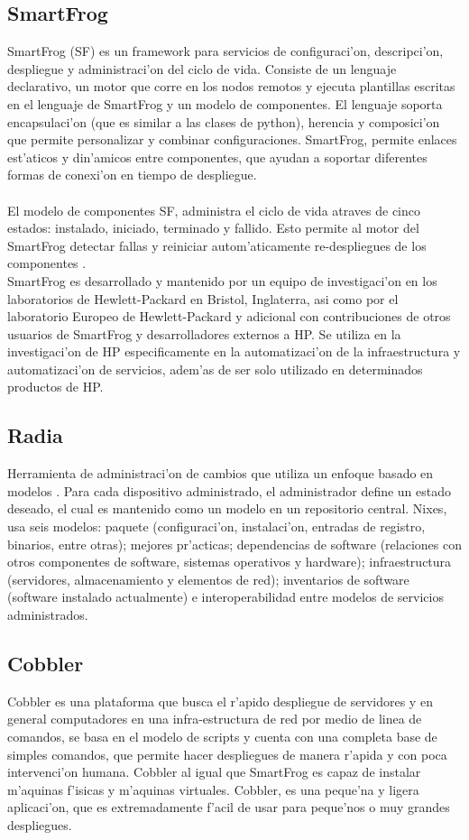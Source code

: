 \subsection{SmartFrog}
SmartFrog (SF) es un framework para servicios de configuraci'on, descripci'on, despliegue y administraci'on del ciclo de vida. Consiste de un lenguaje declarativo, un motor que corre en los nodos remotos y ejecuta plantillas escritas en el lenguaje de SmartFrog y un modelo de componentes. El lenguaje soporta encapsulaci'on (que es similar a las clases de python), herencia y composici'on que permite personalizar y combinar configuraciones. SmartFrog, permite enlaces est'aticos y din'amicos entre componentes, que ayudan a soportar diferentes formas de conexi'on en tiempo de despliegue.\\
\\
El modelo de componentes SF, administra el ciclo de vida atraves de cinco estados: instalado, iniciado, terminado y fallido. Esto permite al motor del SmartFrog detectar fallas y reiniciar autom'aticamente re-despliegues de los componentes \cite{Smart09}.
\\
SmartFrog es desarrollado y mantenido por un equipo de investigaci'on en los laboratorios de Hewlett-Packard en Bristol, Inglaterra, asi como por el laboratorio Europeo de Hewlett-Packard y adicional con contribuciones de otros usuarios de SmartFrog y desarrolladores externos a HP. Se utiliza en la investigaci'on de HP especificamente en la automatizaci'on de la infraestructura y automatizaci'on de servicios, adem'as de ser solo utilizado en determinados productos de HP.

\subsection{Radia}
Herramienta de administraci'on de cambios que utiliza un enfoque basado en modelos \cite{Radia15}. Para cada dispositivo administrado, el administrador define un estado deseado, el cual es mantenido como un modelo en un repositorio central. Nixes, usa seis modelos: paquete (configuraci'on, instalaci'on, entradas de registro, binarios, entre otras); mejores pr'acticas; dependencias de software (relaciones con otros componentes de software, sistemas operativos y hardware); infraestructura (servidores, almacenamiento y elementos de red); inventarios de software (software instalado actualmente) e interoperabilidad entre modelos de servicios administrados. 

\subsection{Cobbler}
Cobbler es una plataforma que busca el r'apido despliegue de servidores y en general computadores en una infra-estructura de red por medio de linea de comandos, se basa en el modelo de scripts y cuenta con una completa base de simples comandos, que permite hacer despliegues de manera r'apida y con poca intervenci'on humana. Cobbler al igual que SmartFrog es capaz de instalar m'aquinas f'isicas y m'aquinas virtuales. Cobbler, es una peque'na y ligera aplicaci'on, que es extremadamente f'acil de usar para peque'nos o muy grandes despliegues. \cite{Cobbler15}

